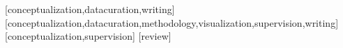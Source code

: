 \documentclass[spanish]{textolivre}
\begin{document}
\begin{contributors}
[conceptualization,datacuration,writing]
[conceptualization,datacuration,methodology,visualization,supervision,writing]
[conceptualization,supervision]
[review]
\end{contributors}

\end{document}

